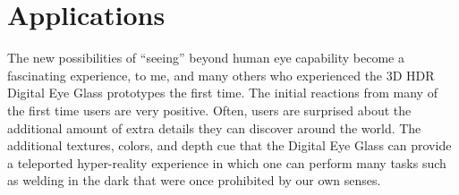 




\section{Applications}
The new possibilities of ``seeing'' beyond human eye capability become a fascinating experience, to 
me, and many others who experienced the 3D HDR Digital Eye Glass prototypes the first time. The 
initial reactions from many of the first time users are very positive. Often, users are surprised about 
the additional amount of extra details they can discover around the world. The additional textures, 
colors, and depth cue that the Digital Eye Glass can provide a teleported hyper-reality experience in 
which one can perform many tasks such as welding in the dark that were once prohibited by our own 
senses. 

